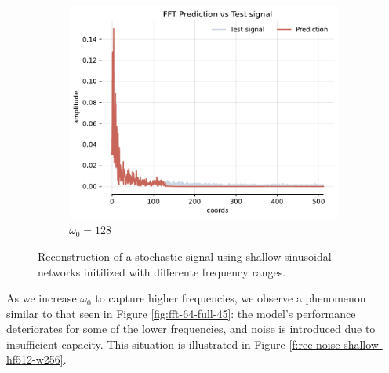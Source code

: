 \begin{figure}[h]
\begin{subfigure}[b]{0.32\textwidth}
        \centering
        \includegraphics[width=\textwidth]{img/ch3/fft-noise-h0-w128.pdf}
        \caption{$\omega_0=128$}
        \label{fig:fft-noise-shallow-w128}
    \end{subfigure}
    \caption{Reconstruction of a stochastic signal using shallow sinusoidal networks initilized with differente frequency ranges.}
    \label{f:rec-noise-shallow}
\end{figure}

As we increase $\omega_0$ to capture higher frequencies, we observe a phenomenon similar to that seen in Figure \ref{fig:fft-64-full-45}: the model's performance deteriorates for some of the lower frequencies, and noise is introduced due to insufficient capacity. This situation is illustrated in Figure \ref{f:rec-noise-shallow-hf512-w256}.

